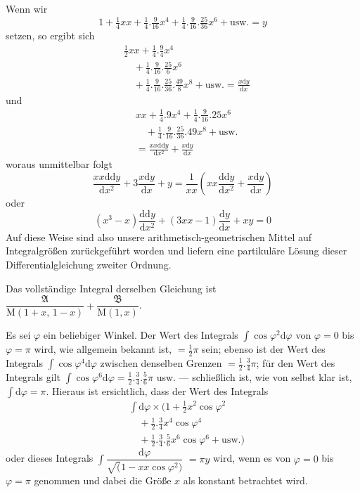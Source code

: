 \begingroup
\renewcommand{\arraystretch}{1.45}
Wenn wir
\[
1+\tfrac14xx+\tfrac14.\tfrac9{16}x^4
+\tfrac14.\tfrac9{16}.\tfrac{25}{36}x^6+\text{usw.}=y
\]
setzen, so ergibt sich
\[
\begin{aligned}&\tfrac12xx+\tfrac14.\tfrac94x^4\\&\quad+\tfrac14.\tfrac9{16}.\tfrac{25}{6}x^6\\&\quad+\tfrac14.\tfrac9{16}.\tfrac{25}{36}.\tfrac{49}{8}x^8
+\text{usw.}=\frac{x\mathrm{d}y}{\mathrm{d}x}\end{aligned}
\]
und
\[
\begin{aligned}&xx+\tfrac14.9x^4+\tfrac14.\tfrac9{16}.25x^6\\&\quad+\tfrac14.\tfrac9{16}.\tfrac{25}{36}.49x^8+\text{usw.}\\&=\frac{xx\mathrm{dd}y}{\mathrm{d}x^2}+\frac{x\mathrm{d}y}{\mathrm{d}x}\end{aligned}
\]
woraus unmittelbar folgt
\[
\frac{xx\mathrm{dd}y}{\mathrm{d}x^2}+3\frac{x\mathrm{d}y}{\mathrm{d}x}+y
=\frac1{xx}\left(xx\frac{\mathrm{dd}y}{\mathrm{d}x^2}+\frac{x\mathrm{d}y}{\mathrm{d}x}\right)
\]
oder
\[
(x^3-x)\frac{\mathrm{dd}y}{\mathrm{d}x^2}
+(3xx-1)\frac{\mathrm{d}y}{\mathrm{d}x}+xy=0
\]
Auf diese Weise sind also unsere arithmetisch-geometrischen Mittel auf Integralgrößen
zurückgeführt worden und liefern eine partikuläre Lösung dieser Differentialgleichung zweiter Ordnung.

Das vollständige Integral derselben Gleichung ist\hfill\\{}
\(\dfrac{\mathfrak{A}}{\mathrm{M}(1+x,\,1-x)}+\dfrac{\mathfrak{B}}{\mathrm{M}(1,x)}\).

Es sei \(\varphi\) ein beliebiger Winkel. Der Wert des Integrals
\(\int\cos\varphi^2\mathrm{d}\varphi\) von \(\varphi=0\) bis
\(\varphi=\pi\) wird, wie allgemein bekannt ist, \(=\tfrac12\pi\) sein; ebenso ist
der Wert des Integrals \(\int\cos\varphi^4\mathrm{d}\varphi\) zwischen denselben Grenzen
\(=\tfrac12.\tfrac34\pi\); für den Wert des Integrals gilt
\(\int\cos\varphi^6\mathrm{d}\varphi=\tfrac12.\tfrac34.\tfrac56\pi\)
usw. --- schließlich ist, wie von selbst klar ist, \(\int\mathrm{d}\varphi=\pi\).
Hieraus ist ersichtlich, dass der Wert des Integrals
\[
\begin{aligned}&\int\mathrm{d}\varphi\times
\bigl(1+\tfrac12x^2\cos\varphi^2\\&\quad+\tfrac12.\tfrac34x^4\cos\varphi^4\\&\quad+\tfrac12.\tfrac34.\tfrac56x^6\cos\varphi^6+\text{usw.}\bigr)\end{aligned}
\]
oder dieses Integrals \(\int\dfrac{\mathrm{d}\varphi}{\surd(1-xx\cos\varphi^2)}\)
\(=\pi y\) wird, wenn es von \(\varphi=0\) bis \(\varphi=\pi\) genommen
und dabei die Größe \(x\) als konstant betrachtet wird.

